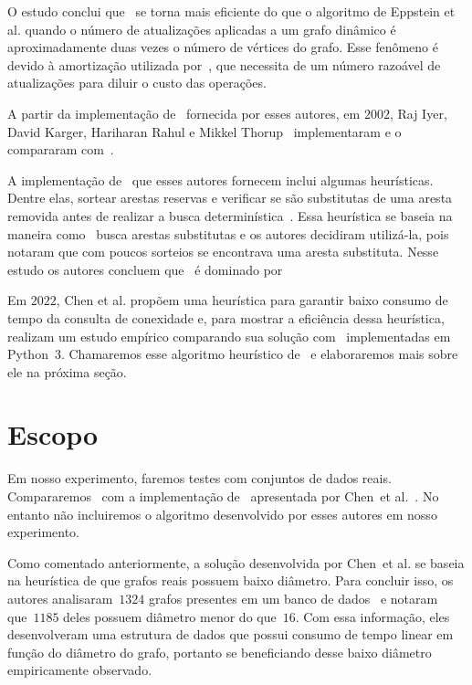 O estudo conclui que~\HK{} se torna mais eficiente do que o algoritmo de Eppstein et al. quando o número de atualizações aplicadas a um grafo dinâmico é aproximadamente duas vezes o número de vértices do grafo. Esse fenômeno é devido à amortização utilizada por~\HK{}, que necessita de um número razoável de atualizações para diluir o custo das operações. 

A partir da implementação de~\HK{} fornecida por esses autores, em $2002$, Raj Iyer, David Karger, Hariharan Rahul e Mikkel Thorup~\cite{EmpiricalStudy2002} implementaram \HDT{} e o compararam com~\HK{}.

A implementação de~\HDT{} que esses autores fornecem inclui algumas heurísticas. Dentre elas, sortear arestas reservas e verificar se são substitutas de uma aresta removida antes de realizar a busca determinística~\cite[Seção 4.1]{EmpiricalStudy2002}.
Essa heurística se baseia na maneira como~\HK{} busca arestas substitutas e os autores decidiram utilizá-la, pois notaram que com poucos sorteios se encontrava uma aresta substituta. 
Nesse estudo os autores concluem que~\HK{} é dominado por~\HDT{}



Em $2022$, Chen et al.\cite{QC22} propõem uma heurística para garantir baixo consumo de tempo da consulta de conexidade e, para mostrar a eficiência dessa heurística, realizam um estudo empírico comparando sua solução com~\HK{} implementadas em Python~$3$.
Chamaremos esse algoritmo heurístico de~\CLHB{} e elaboraremos mais sobre ele na próxima seção.



\section{Escopo}

Em nosso experimento, faremos testes com conjuntos de dados reais.
Compararemos~\HDT{} com a implementação de~\HK{} apresentada por Chen~et al.~\cite{QC22}.
No entanto não incluiremos o algoritmo desenvolvido por esses autores em nosso experimento.

Como comentado anteriormente, a solução desenvolvida por Chen~et al. se baseia na heurística de que grafos reais possuem baixo diâmetro.
Para concluir isso, os autores analisaram~$1324$ grafos presentes em um banco de dados~\cite{KONECT} e notaram que~$1185$ deles possuem diâmetro menor do que~$16$.
Com essa informação, eles desenvolveram uma estrutura de dados que possui consumo de tempo linear em função do diâmetro do grafo,
portanto se beneficiando desse baixo diâmetro empiricamente observado.

